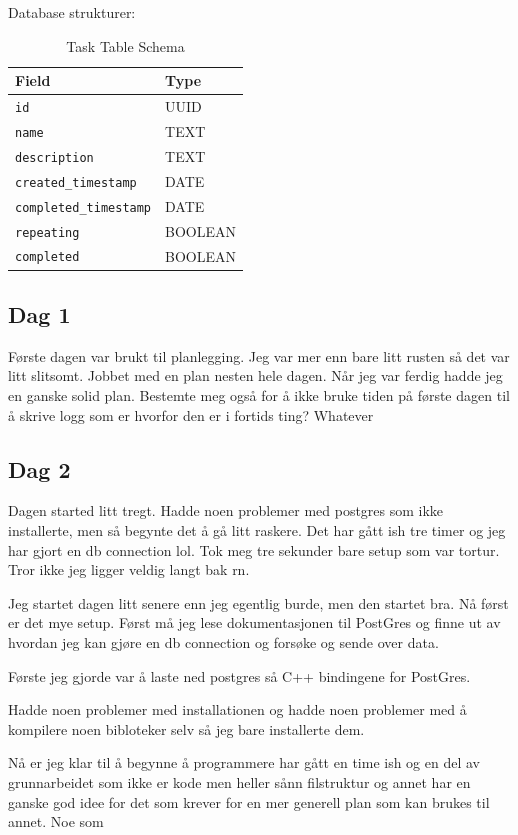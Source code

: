 \documentclass{article}
\begin{document}
Database strukturer:
\begin{table}[h]
\centering
\begin{tabular}{|l|l|}
\hline
\textbf{Field} & \textbf{Type} \\
\hline
\texttt{id} & UUID \\
\texttt{name} & TEXT \\
\texttt{description} & TEXT \\
\texttt{created\_timestamp} & DATE \\
\texttt{completed\_timestamp} & DATE \\
\texttt{repeating} & BOOLEAN \\
\texttt{completed} & BOOLEAN \\
\hline
\end{tabular}
\caption{Task Table Schema}
\label{tab:task_schema}
\end{table}

\subsection{Dag 1}
Første dagen var brukt til planlegging. Jeg var mer enn bare litt rusten så det var litt slitsomt. Jobbet med en plan nesten hele dagen. Når jeg var ferdig hadde jeg en ganske solid plan. Bestemte meg også for å ikke bruke tiden på første dagen til å skrive logg som er hvorfor den er i fortids ting? Whatever
\subsection{Dag 2}
Dagen started litt tregt. Hadde noen problemer med postgres som ikke installerte, men så begynte det å gå litt raskere. Det har gått ish tre timer og jeg har gjort en db connection lol. Tok meg tre sekunder bare setup som var tortur. Tror ikke jeg ligger veldig langt bak rn. 




Jeg startet dagen litt senere enn jeg egentlig burde, men den startet bra. Nå først er det mye setup. Først må jeg lese dokumentasjonen til PostGres og finne ut av hvordan jeg kan gjøre en db connection og forsøke og sende over data.

Første jeg gjorde var å laste ned postgres så C++ bindingene for PostGres.

Hadde noen problemer med installationen og hadde noen problemer med å kompilere noen bibloteker selv så jeg bare installerte dem. 

Nå er jeg klar til å begynne å programmere har gått en time ish og en del av grunnarbeidet som ikke er kode men heller sånn filstruktur og annet har en ganske god idee for det som krever for en mer generell plan som kan brukes til annet. Noe som
\end{document}
